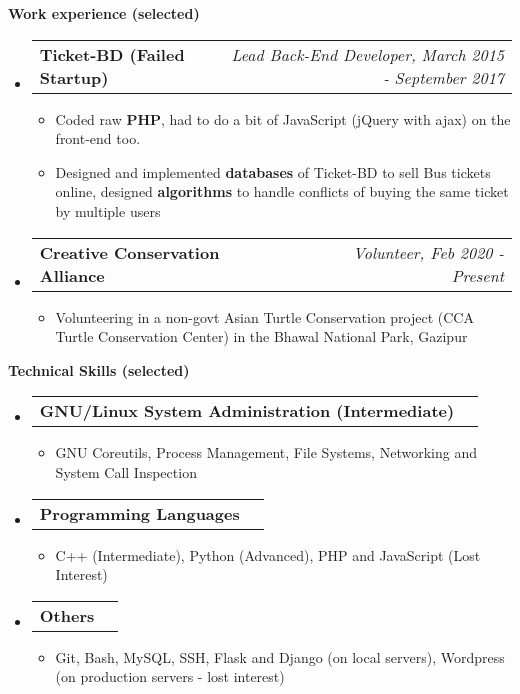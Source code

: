 \documentclass[letterpaper,10pt]{article}
\makeatletter
\newcommand{\resheading}[1]{{\large \colorbox{mygrey}{\begin{minipage}{\textwidth}{\textbf{#1 \vphantom{p\^{E}}}}\end{minipage}}}}
\newcommand{\ressubheading}[4]{
	\begin{tabular*}{7.1in}{l@{\extracolsep{\fill}}r}
		\textbf{#1} & \textit{#4} \\
	\end{tabular*}\vspace{-6pt}}
\makeatother
\begin{document}
	\resheading{Work experience (selected)}
	\begin{itemize}
		\item \ressubheading{Ticket-BD (Failed Startup)}{}{}{Lead Back-End Developer, March 2015 - September 2017}
		\begin{itemize}
			\item Coded raw \textbf{PHP}, had to do a bit of JavaScript (jQuery with ajax) on the front-end too.
			\item Designed and implemented \textbf{databases} of Ticket-BD to sell Bus tickets online, designed \textbf{algorithms} to handle conflicts of buying the same ticket by multiple users 
		\end{itemize}
		
		\item \ressubheading{Creative Conservation Alliance}{}{}{Volunteer, Feb 2020 - Present}
		\begin{itemize}
			\item Volunteering in a non-govt Asian Turtle Conservation project (CCA Turtle Conservation Center) in the Bhawal National Park, Gazipur
 
		\end{itemize}
		
	\end{itemize}


	\vspace{0.2in}
	
	\resheading{Technical Skills (selected)}
	\begin{itemize}
		
		\item \ressubheading{GNU/Linux System Administration (Intermediate) }{}{}{}
		\begin{itemize}
			\item GNU Coreutils, Process Management, File Systems, Networking and System Call Inspection
		\end{itemize}
	
		\item \ressubheading{Programming Languages}{}{}{}
		\begin{itemize}
			\item C++ (Intermediate), Python (Advanced), PHP and JavaScript (Lost Interest)
		\end{itemize}
	
		\item \ressubheading{Others}{}{}{}
		\begin{itemize}
			\item Git, Bash, MySQL, SSH, Flask and Django (on local servers), Wordpress (on production servers - lost interest)
		\end{itemize}
			
			
		\end{itemize}
	
\end{document}
